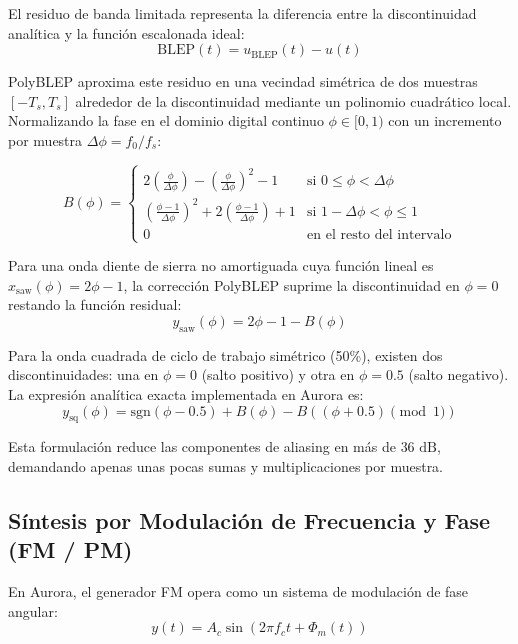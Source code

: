 \documentclass[11pt,a4paper]{article}
\begin{document}
El residuo de banda limitada representa la diferencia entre la discontinuidad analítica y la función escalonada ideal:
\begin{equation}
\text{BLEP}(t) = u_{\text{BLEP}}(t) - u(t)
\end{equation}

PolyBLEP aproxima este residuo en una vecindad simétrica de dos muestras $[-T_s, T_s]$ alrededor de la discontinuidad mediante un polinomio cuadrático local. Normalizando la fase en el dominio digital continuo $\phi \in [0, 1)$ con un incremento por muestra $\Delta\phi = f_0 / f_s$:

\begin{equation}
B(\phi) = \begin{cases} 
2\left(\frac{\phi}{\Delta\phi}\right) - \left(\frac{\phi}{\Delta\phi}\right)^2 - 1 & \text{si } 0 \le \phi < \Delta\phi \\
\left(\frac{\phi - 1}{\Delta\phi}\right)^2 + 2\left(\frac{\phi - 1}{\Delta\phi}\right) + 1 & \text{si } 1 - \Delta\phi < \phi \le 1 \\
0 & \text{en el resto del intervalo}
\end{cases}
\end{equation}

Para una onda diente de sierra no amortiguada cuya función lineal es $x_{\text{saw}}(\phi) = 2\phi - 1$, la corrección PolyBLEP suprime la discontinuidad en $\phi = 0$ restando la función residual:
\begin{equation}
y_{\text{saw}}(\phi) = 2\phi - 1 - B(\phi)
\end{equation}

Para la onda cuadrada de ciclo de trabajo simétrico (50\%), existen dos discontinuidades: una en $\phi = 0$ (salto positivo) y otra en $\phi = 0.5$ (salto negativo). La expresión analítica exacta implementada en Aurora es:
\begin{equation}
y_{\text{sq}}(\phi) = \text{sgn}(\phi - 0.5) + B(\phi) - B\left((\phi + 0.5) \pmod 1\right)
\end{equation}

Esta formulación reduce las componentes de aliasing en más de $36\text{ dB}$, demandando apenas unas pocas sumas y multiplicaciones por muestra.

\subsection{Síntesis por Modulación de Frecuencia y Fase (FM / PM)}
En Aurora, el generador FM opera como un sistema de modulación de fase angular:
\begin{equation}
y(t) = A_c \sin\left(2\pi f_c t + \Phi_m(t)\right)
\end{equation}
\end{document}
